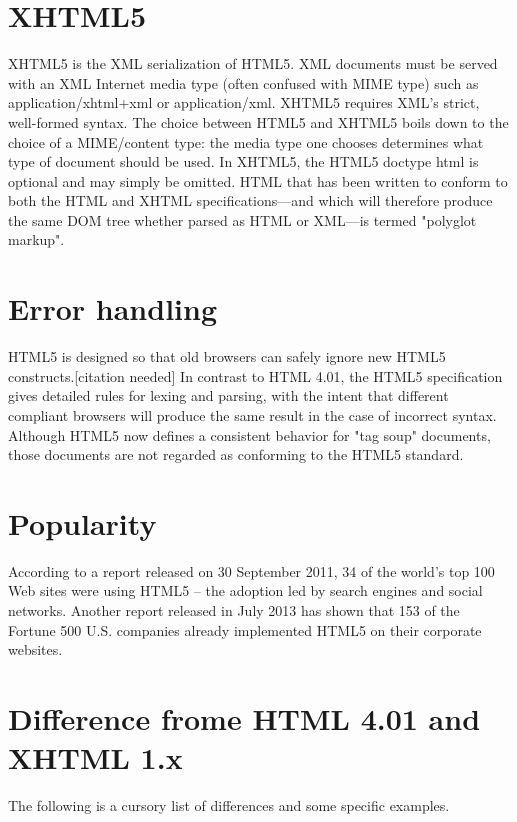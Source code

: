\section{XHTML5}


XHTML5 is the XML serialization of HTML5. XML documents must be served with an XML Internet media type (often confused with MIME type) such as application/xhtml+xml or application/xml. XHTML5 requires XML's strict, well-formed syntax. The choice between HTML5 and XHTML5 boils down to the choice of a MIME/content type: the media type one chooses determines what type of document should be used. In XHTML5, the HTML5 doctype html is optional and may simply be omitted. HTML that has been written to conform to both the HTML and XHTML specifications—and which will therefore produce the same DOM tree whether parsed as HTML or XML—is termed "polyglot markup".



\section{Error handling}

HTML5 is designed so that old browsers can safely ignore new HTML5 constructs.[citation needed] In contrast to HTML 4.01, the HTML5 specification gives detailed rules for lexing and parsing, with the intent that different compliant browsers will produce the same result in the case of incorrect syntax. Although HTML5 now defines a consistent behavior for "tag soup" documents, those documents are not regarded as conforming to the HTML5 standard.


\section{Popularity}

According to a report released on 30 September 2011, 34 of the world's top 100 Web sites were using HTML5 – the adoption led by search engines and social networks. Another report released in July 2013 has shown that 153 of the Fortune 500 U.S. companies already implemented HTML5 on their corporate websites.



\section{Difference frome HTML 4.01 and XHTML 1.x}


The following is a cursory list of differences and some specific examples.

